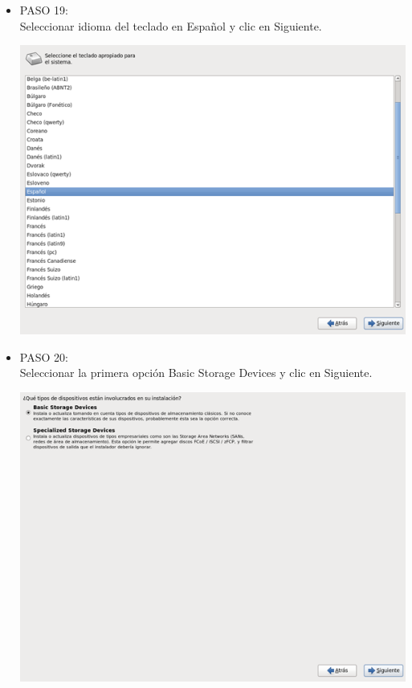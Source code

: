 \begin{itemize}
\item PASO 19:
\\Seleccionar idioma del teclado en Español y clic en Siguiente.
		\begin{center}
		\includegraphics[width=13cm]{./Imagenes/19}
		\end{center}
	
	\end{itemize} 

\begin{itemize}
\item PASO 20:
\\Seleccionar la primera opción  Basic Storage Devices y clic en Siguiente.
		\begin{center}
		\includegraphics[width=13cm]{./Imagenes/20}
		\end{center}
	\\\
	\end{itemize} 

